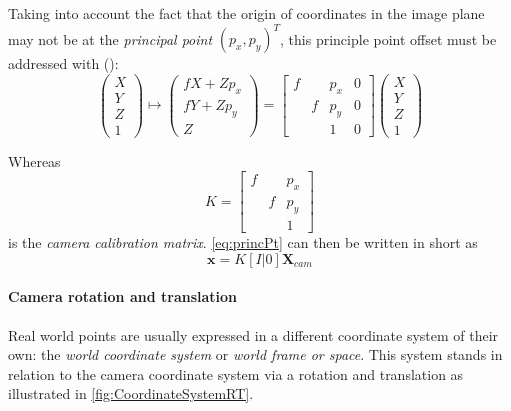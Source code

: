 Taking into account the fact that the origin of coordinates in the image plane may not be at the \textit{principal point} $(p_x, p_y)^T$, this principle point offset must be addressed with (\cite[p.155]{Hartley.2011}):
\begin{equation} 
 \begin{pmatrix}
  X \\
  Y \\
  Z \\
  1
 \end{pmatrix}\longmapsto
 \begin{pmatrix}
  fX+Zp_x \\
  fY+Zp_y \\
  Z
 \end{pmatrix}=
 \begin{bmatrix}
  f & & p_x & 0\\
   & f & p_y & 0 \\
   &  & 1 & 0
 \end{bmatrix}
 \begin{pmatrix}
  X \\
  Y \\
  Z \\
  1
 \end{pmatrix}\label{eq:princPt}
\end{equation} 

Whereas 
\begin{equation}
 K=
 \begin{bmatrix}
  f & & p_x\\
   & f & p_y\\
   &  & 1
 \end{bmatrix}
\end{equation}
is the \textit{camera calibration matrix}. \autoref{eq:princPt} can then be written in short as 
\begin{equation}
 \mathbf{x}=K[I|0]\mathbf{X}_{cam}\label{eq:princPtShort}
\end{equation}

\paragraph{Camera rotation and translation}
Real world points are usually expressed in a different coordinate system of their own: the \textit{world coordinate system} or \textit{world frame or space}. This system stands in relation to the camera coordinate system via a rotation and translation as illustrated in \autoref{fig:CoordinateSystemRT}.


